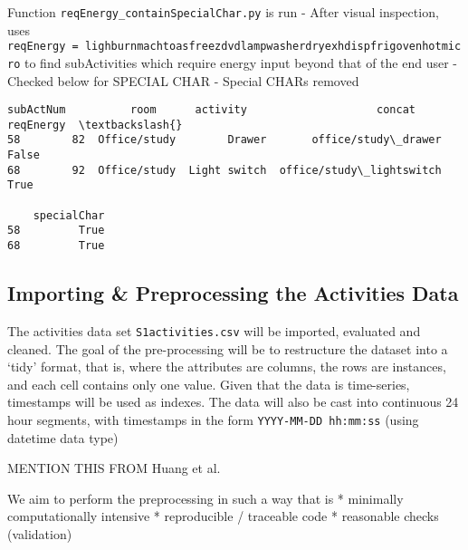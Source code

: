 \documentclass[reprint, floatfix, groupaddress, prb]{revtex4-1}
\newcommand{\prompt}[4]{
        \llap{{\color{#2}[#3]: #4}}\vspace{-1.25em}
    }
\begin{document}
Function \texttt{reqEnergy\_containSpecialChar.py} is run - After visual
inspection, uses
\texttt{reqEnergy\ =\ \textquotesingle{}ligh\textbar{}burn\textbar{}mach\textbar{}toas\textbar{}freez\textbar{}dvd\textbar{}lamp\textbar{}washer\textbar{}dry\textbar{}exh\textbar{}disp\textbar{}frig\textbar{}oven\textbar{}hot\textbar{}micro\textquotesingle{}}
to find subActivities which require energy input beyond that of the end
user - Checked below for SPECIAL CHAR - Special CHARs removed



            \begin{tcolorbox}[breakable, boxrule=.5pt, size=fbox, pad at break*=1mm, opacityfill=0]
\prompt{Out}{outcolor}{13}{\hspace{3.5pt}}
\begin{Verbatim}[commandchars=\\\{\}]
   subActNum          room      activity                    concat  reqEnergy  \textbackslash{}
58        82  Office/study        Drawer       office/study\_drawer      False
68        92  Office/study  Light switch  office/study\_lightswitch       True

    specialChar
58         True
68         True
\end{Verbatim}
\end{tcolorbox}
        
    \hypertarget{importing-preprocessing-the-activities-data}{%
\subsection{Importing \& Preprocessing the Activities
Data}\label{importing-preprocessing-the-activities-data}}

    The activities data set \texttt{S1activities.csv} will be imported,
evaluated and cleaned. The goal of the pre-processing will be to
restructure the dataset into a `tidy' format, that is, where the
attributes are columns, the rows are instances, and each cell contains
only one value. Given that the data is time-series, timestamps will be
used as indexes. The data will also be cast into continuous 24 hour
segments, with timestamps in the form \texttt{YYYY-MM-DD\ hh:mm:ss}
(using datetime data type)

MENTION THIS FROM Huang et al.~

We aim to perform the preprocessing in such a way that is * minimally
computationally intensive * reproducible / traceable code * reasonable
checks (validation)
\end{document}
